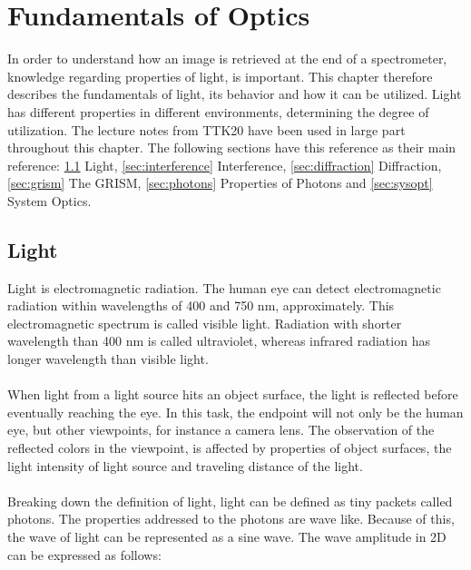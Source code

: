 \chapter{Fundamentals of Optics}
\label{chap:theory1}

In order to understand how an image is retrieved at the end of a spectrometer, knowledge regarding properties of light, is important. This chapter therefore describes the fundamentals of light, its behavior and how it can be utilized. Light has different properties in different environments, determining the degree of utilization. The lecture notes from TTK20 \todo{[kilde]} have been used in large part throughout this chapter. The following sections have this reference as their main reference: \ref{sec:light} Light, \ref{sec:interference} Interference, \ref{sec:diffraction} Diffraction, \ref{sec:grism} The GRISM, \ref{sec:photons} Properties of Photons and \ref{sec:sysopt} System Optics. 

\section{Light} \label{sec:light}
Light is electromagnetic radiation. The human eye can detect electromagnetic radiation within wavelengths of 400 and 750 nm, approximately. This electromagnetic spectrum is called visible light. Radiation with shorter wavelength than 400 nm is called ultraviolet, whereas infrared radiation has longer wavelength than visible light.
\\\\
When light from a light source hits an object surface, the light is reflected before eventually reaching the eye. In this task, the endpoint will not only be the human eye, but other viewpoints, for instance a camera lens. The observation of the reflected colors in the viewpoint, is affected by properties of object surfaces, the light intensity of light source and traveling distance of the light.
\\\\
Breaking down the definition of light, light can be defined as tiny packets called photons. The properties addressed to the photons are wave like. Because of this, the wave of light can be represented as a sine wave. The wave amplitude in 2D can be expressed as follows: 

